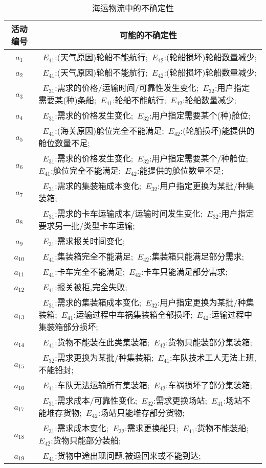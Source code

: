 \begin{table}[htbp]
    \caption{海运物流中的不确定性}
    \vspace{-0.5em}\label{table:ocean_shipping_uc}\centering{}
    \begin{tabularx}{\textwidth}{cX}
        \toprule
        活动编号  & \multicolumn{1}{c}{可能的不确定性} \\
        \midrule
        ~$a_1$~ & ~$E_{41}$:(天气原因)轮船不能航行;~$E_{42}$:(轮船损坏)轮船数量减少; \\
        ~$a_2$~ & ~$E_{41}$:(天气原因)轮船不能航行;~$E_{42}$:(轮船损坏)轮船数量减少; \\
        ~$a_3$~ & ~$E_{31}$:需求的价格/运输时间/可靠性发生变化;~$E_{32}$:用户指定需要某(种)条船;~$E_{41}$:轮船不能航行;~$E_{42}$:轮船数量减少; \\
        ~$a_4$~ & ~$E_{31}$:需求的价格发生变化;~$E_{32}$:用户指定需要某个(种)舱位; \\
        ~$a_5$~ & ~$E_{41}$:(海关原因)舱位完全不能满足;~$E_{42}$:(轮船损坏)能提供的舱位数量不足; \\
        ~$a_6$~ & ~$E_{31}$:需求的价格发生变化;~$E_{32}$:用户指定需要某个/种舱位;~$E_{41}$:舱位完全不能满足;~$E_{42}$:能提供的舱位数量不足; \\
        ~$a_7$~ & ~$E_{31}$:需求的集装箱成本变化;~$E_{32}$:用户指定更换为某批/种集装箱; \\
        ~$a_8$~ & ~$E_{31}$:需求的卡车运输成本/运输时间发生变化;~$E_{32}$:用户指定要求另一批/类型卡车运输; \\
        ~$a_9$~ & ~$E_{31}$:需求报关时间变化; \\
        ~$a_{10}$~ & ~$E_{41}$:集装箱完全不能满足;~$E_{42}$:集装箱只能满足部分需求; \\
        ~$a_{11}$~ & ~$E_{41}$:卡车完全不能满足;~$E_{42}$:卡车只能满足部分需求; \\
        ~$a_{12}$~ & ~$E_{41}$:报关被拒,完全失败; \\
        ~$a_{13}$~ & ~$E_{31}$:需求的集装箱成本变化;~$E_{32}$:用户指定更换为某批/种集装箱;~$E_{41}$:运输过程中车祸集装箱全部损坏;~$E_{42}$:运输过程中集装箱部分损坏; \\
        ~$a_{14}$~ & ~$E_{41}$:货物不能装在此类集装箱;~$E_{42}$:货物只能装部分集装箱; \\
        ~$a_{15}$~ & ~$E_{32}$:需求更换为某批/种集装箱;~$E_{41}$:车队技术工人无法上班,不能铅封; \\
        ~$a_{16}$~ & ~$E_{41}$:车队无法运输所有集装箱;~$E_{42}$:车祸损坏了部分集装箱; \\
        ~$a_{17}$~ & ~$E_{31}$:需求成本/可靠性变化;~$E_{32}$:需求更换场站;~$E_{41}$:场站不能堆存货物;~$E_{42}$:场站只能堆存部分货物; \\
        ~$a_{18}$~ & ~$E_{31}$:需求成本变化;~$E_{32}$:需求更换船只;~$E_{41}$:货物不能装船;~$E_{42}$:货物只能部分装船; \\
        ~$a_{19}$~ & ~$E_{41}$:货物中途出现问题,被退回来或不能到达; \\
        \bottomrule
    \end{tabularx}%
\end{table}%

